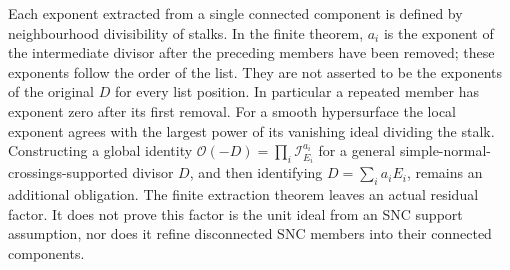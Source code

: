 \begin{remark}
Each exponent extracted from a single connected component is defined
by neighbourhood divisibility of stalks. In the finite theorem, $a_i$
is the exponent of the intermediate divisor after the preceding members
have been removed; these exponents follow the order of the list. They
are not asserted to be the exponents of the original $D$ for every list
position. In particular a repeated member has exponent zero after its
first removal. For a smooth hypersurface the local exponent agrees with the largest
power of its vanishing ideal dividing the stalk.  Constructing a global
identity $\mathcal O(-D)=\prod_i\mathcal I_{E_i}^{a_i}$ for a general
simple-normal-crossings-supported divisor $D$, and then identifying
$D=\sum_i a_iE_i$, remains an additional obligation.
The finite extraction theorem leaves an actual residual factor. It
does not prove this factor is the unit ideal from an SNC support
assumption, nor does it refine disconnected SNC members into their
connected components.
\end{remark}
